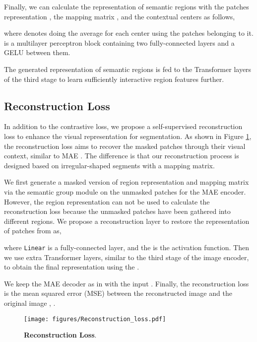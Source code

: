 \documentclass{article}
\theoremstyle{plain}
\theoremstyle{definition}
\theoremstyle{remark}
\begin{document}
Finally, we can calculate the representation of semantic regions  with the patches representation , the mapping matrix , and the contextual centers  as follows,

where  denotes doing the average for each center using the patches belonging to it.  is a multilayer perceptron block containing two fully-connected layers and a GELU \cite{hendrycks2016gaussian} between them.

The generated representation of semantic regions  is fed to the Transformer layers of the third stage to learn sufficiently interactive region features  further.

\subsection{Reconstruction Loss}
In addition to the contrastive loss, we propose a self-supervised reconstruction loss to enhance the visual representation for segmentation. As shown in Figure \ref{fig:reconstruction_loss}, the reconstruction loss aims to recover the masked patches through their visual context, similar to MAE \cite{He2022Masked}. The difference is that our reconstruction process is designed based on irregular-shaped segments with a mapping matrix. 

We first generate a masked version of region representation  and mapping matrix  via the semantic group module on the unmasked patches for the MAE encoder. However, the region representation can not be used to calculate the reconstruction loss because the unmasked patches have been gathered into different regions. We propose a reconstruction layer to restore the representation of patches from  as,

where \texttt{Linear} is a fully-connected layer, and the  is the activation function.
Then we use extra Transformer layers, similar to the third stage of the image encoder, to obtain the final representation  using the .

We keep the MAE decoder as in \cite{He2022Masked} with the input . Finally, the reconstruction loss is the mean squared error (MSE) between the reconstructed image  and the original image , . 
\begin{figure}[tp]
    \centering
    \texttt{[image: figures/Reconstruction\_loss.pdf]}
    \caption{\textbf{Reconstruction Loss}.}
    \label{fig:reconstruction_loss}
\end{figure}
\end{document}
